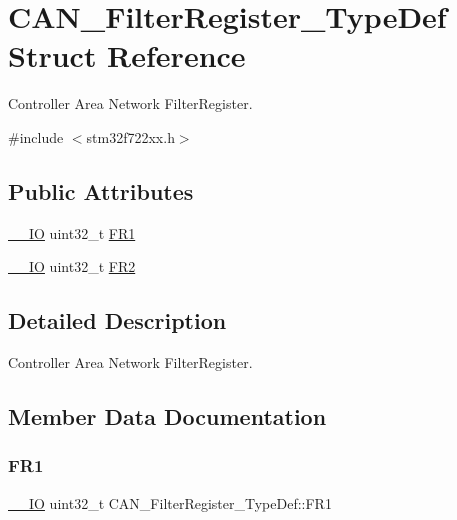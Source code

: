 \hypertarget{struct_c_a_n___filter_register___type_def}{}\section{C\+A\+N\+\_\+\+Filter\+Register\+\_\+\+Type\+Def Struct Reference}
\label{struct_c_a_n___filter_register___type_def}


Controller Area Network Filter\+Register.  




{\ttfamily \#include $<$stm32f722xx.\+h$>$}

\subsection*{Public Attributes}
\begin{DoxyCompactItemize}
\item 
\mbox{\hyperlink{core__sc300_8h_aec43007d9998a0a0e01faede4133d6be}{\+\_\+\+\_\+\+IO}} uint32\+\_\+t \mbox{\hyperlink{struct_c_a_n___filter_register___type_def_ac9bc1e42212239d6830582bf0c696fc5}{F\+R1}}
\item 
\mbox{\hyperlink{core__sc300_8h_aec43007d9998a0a0e01faede4133d6be}{\+\_\+\+\_\+\+IO}} uint32\+\_\+t \mbox{\hyperlink{struct_c_a_n___filter_register___type_def_a77959e28a302b05829f6a1463be7f800}{F\+R2}}
\end{DoxyCompactItemize}


\subsection{Detailed Description}
Controller Area Network Filter\+Register. 

\subsection{Member Data Documentation}
\mbox{\label{struct_c_a_n___filter_register___type_def_ac9bc1e42212239d6830582bf0c696fc5}} 
\subsubsection{\texorpdfstring{FR1}{FR1}}
{\footnotesize\ttfamily \mbox{\hyperlink{core__sc300_8h_aec43007d9998a0a0e01faede4133d6be}{\+\_\+\+\_\+\+IO}} uint32\+\_\+t C\+A\+N\+\_\+\+Filter\+Register\+\_\+\+Type\+Def\+::\+F\+R1}

